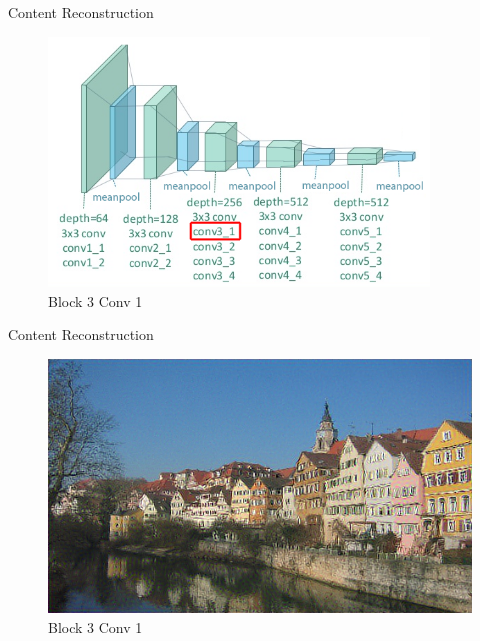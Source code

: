 \documentclass{beamer}
\begin{document}
\begin{frame}{Content Reconstruction}
\begin{figure}[ht]
\centering
\includegraphics[width=0.9\textwidth]{img/vgg19/content/block3_conv1}
\caption*{Block 3 Conv 1}
\end{figure}
\end{frame}
\begin{frame}{Content Reconstruction}
\begin{figure}[ht]
\centering
\includegraphics[width=\textwidth]{img/content/block3_conv1.png}
\caption*{Block 3 Conv 1}
\end{figure}
\end{frame}
\end{document}
